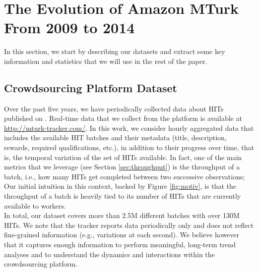 \section{The Evolution of Amazon MTurk From 2009 to 2014}
\label{sec:stats}

In this section, we start by describing our datasets and extract some key information and statistics that we will use in the rest of the paper.

\subsection{Crowdsourcing Platform Dataset}
\label{sec:tracker}
Over the past five years, we have periodically collected data about HITs published on \amt{}.
Real-time data that we collect from the platform is available at \url{http://mturk-tracker.com/}. In this work, we consider hourly aggregated data that includes the available HIT batches and their metadata (title, description, rewards, required qualifications, etc.), in addition to their progress over time, that is, the temporal variation of the set of HITs available. In fact, one of the main metrics that we leverage (see Section \ref{sec:throughput}) is the throughput of a batch, i.e., how many HITs  get completed between two successive observations; Our initial intuition in this context, backed by Figure \ref{fig:motiv}, is that the throughput of a batch is heavily tied to its number of HITs that are currently available to workers.\\
In total, our dataset covers more than 2.5M different batches with over 130M HITs.
We note that the tracker reports data periodically only and does not reflect fine-grained information (e.g., variations at each second). We believe however that it captures enough information to perform meaningful, long-term trend analyses and to understand the dynamics and interactions within the crowdsourcing platform.\\

